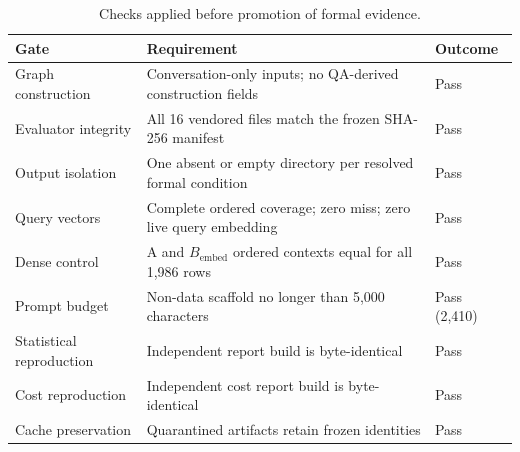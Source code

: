 \documentclass[10pt,twocolumn]{article}
\newcommand{\bembed}{B_{\mathrm{embed}}}
\begin{document}
\begin{table}[h]
\centering
\caption{Checks applied before promotion of formal evidence.}
\label{tab:gates}
\begin{tabularx}{\textwidth}{@{}lXl@{}}
\toprule
Gate & Requirement & Outcome \\
\midrule
Graph construction & Conversation-only inputs; no QA-derived construction fields & Pass \\
Evaluator integrity & All 16 vendored files match the frozen SHA-256 manifest & Pass \\
Output isolation & One absent or empty directory per resolved formal condition & Pass \\
Query vectors & Complete ordered coverage; zero miss; zero live query embedding & Pass \\
Dense control & A and \(\bembed\) ordered contexts equal for all 1,986 rows & Pass \\
Prompt budget & Non-data scaffold no longer than 5,000 characters & Pass (2,410) \\
Statistical reproduction & Independent report build is byte-identical & Pass \\
Cost reproduction & Independent cost report build is byte-identical & Pass \\
Cache preservation & Quarantined artifacts retain frozen identities & Pass \\
\bottomrule
\end{tabularx}
\end{table}
\end{document}
